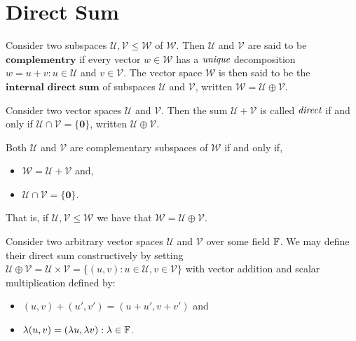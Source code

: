 
\section{Direct Sum} %
\label{sec:directsum}

Consider two subspaces $\mathcal{U},\mathcal{V} \leq \mathcal{W}$
of $\mathcal{W}$. Then $\mathcal{U}$ and $\mathcal{V}$ are said to be
$\textbf{complementry}$ if every vector $w \in \mathcal{W}$ has a
$\emph{unique}$ decomposition $w=u+v : u \in \mathcal{U}$
and $v \in \mathcal{V}$. The vector space $\mathcal{W}$ is then said to
be the $\textbf{internal direct sum}$ of subspaces $\mathcal{U}$
and $\mathcal{V}$, written $\mathcal{W} = \mathcal{U} \oplus \mathcal{V}$.

\begin{defn}
	Consider two vector spaces $\mathcal{U}$ and $\mathcal{V}$.
	Then the sum $\mathcal{U} + \mathcal{V}$ is called $\emph{direct}$
	if and only if $\mathcal{U} \cap \mathcal{V} = \{ \mathbf{0} \}$,
	written $\mathcal{U} \oplus \mathcal{V}$.
\end{defn}

\begin{defn}
	Both $\mathcal{U}$ and $\mathcal{V}$ are complementary subspaces
	of $\mathcal{W}$ if and only if,
	\begin{itemize}
		\item $\mathcal{W} = \mathcal{U} + \mathcal{V}$ and,
		\item $\mathcal{U} \cap \mathcal{V} = \{ \mathbf{0} \}$.
	\end{itemize}
	That is, if $\mathcal{U},\mathcal{V} \leq \mathcal{W}$ we have that
	$\mathcal{W} = \mathcal{U} \oplus \mathcal{V}$.
\end{defn}

\begin{defn}
	Consider two arbitrary vector spaces $\mathcal{U}$ and $\mathcal{V}$
	over some field $\mathbb{F}$. We may define their direct sum constructively
	by setting $\mathcal{U} \oplus \mathcal{V}
	= \mathcal{U} \times \mathcal{V}
	= \{ (u,v) : u \in \mathcal{U}, v \in \mathcal{V} \}$ with vector
	addition and scalar multiplication defined by:
	\begin{itemize}
		\item $(u,v)+(u',v')=(u+u',v+v')$ and
		\item $\lambda (u,v) = ( \lambda u, \lambda v) : \lambda \in \mathbb{F}$.
	\end{itemize}
\end{defn}

